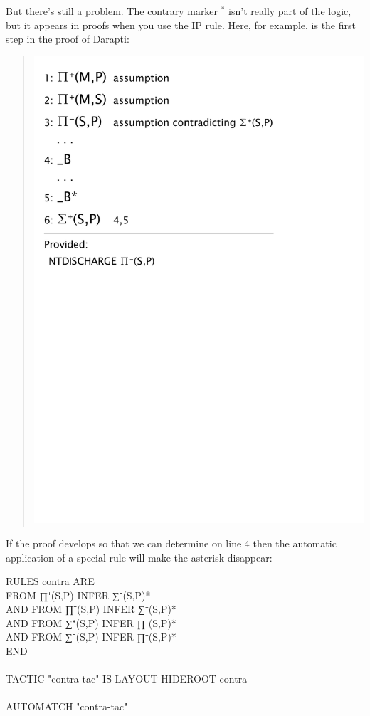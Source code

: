 But there's still a problem. The contrary marker $^{*}$ isn't really part of the logic, but it appears in proofs when you use the IP rule. Here, for example, is the first step in the proof of Darapti:
\begin{quote}
\includegraphics[scale=0.5]{pics/Aristotle/Darapti_0}
\end{quote}
If the proof develops so that we can determine  on line 4 then the automatic application of a special rule will make the asterisk disappear:
\begin{japeish}
RULES contra ARE \\
\tab\tab\tab   FROM ∏⁺(S,P) INFER ∑⁻(S,P)*  \\
\tab AND FROM ∏⁻(S,P) INFER ∑⁺(S,P)*    \\  
\tab AND FROM ∑⁺(S,P) INFER ∏⁻(S,P)*  \\
\tab AND FROM ∑⁻(S,P) INFER ∏⁺(S,P)*  \\
END\\
\\
TACTIC "contra-tac" IS LAYOUT HIDEROOT contra\\
\\
AUTOMATCH "contra-tac"
\end{japeish}
